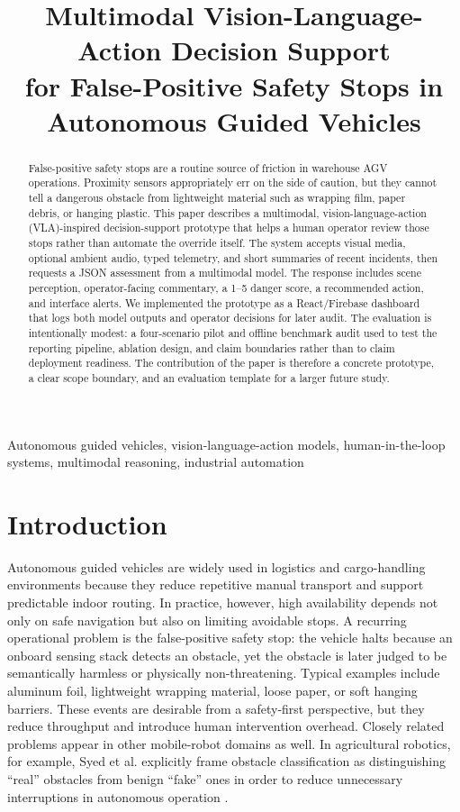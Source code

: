 \documentclass[conference]{IEEEtran}
\title{Multimodal Vision-Language-Action Decision Support\\for False-Positive Safety Stops in Autonomous Guided Vehicles}
\author{
\IEEEauthorblockN{Vikas Rathore, Neha Anil Khot}
\IEEEauthorblockA{
Information Technology\\
Frankfurt University of Applied Sciences\\
Autonomous Intelligent Systems\\
vikas.rathore@stud.fra-uas.de\\
neha.khot@stud.fra-uas.de
}
}
\begin{document}
\maketitle

\begin{abstract}
False-positive safety stops are a routine source of friction in warehouse AGV operations. Proximity sensors appropriately err on the side of caution, but they cannot tell a dangerous obstacle from lightweight material such as wrapping film, paper debris, or hanging plastic. This paper describes a multimodal, vision-language-action (VLA)-inspired decision-support prototype that helps a human operator review those stops rather than automate the override itself. The system accepts visual media, optional ambient audio, typed telemetry, and short summaries of recent incidents, then requests a JSON assessment from a multimodal model. The response includes scene perception, operator-facing commentary, a 1--5 danger score, a recommended action, and interface alerts. We implemented the prototype as a React/Firebase dashboard that logs both model outputs and operator decisions for later audit. The evaluation is intentionally modest: a four-scenario pilot and offline benchmark audit used to test the reporting pipeline, ablation design, and claim boundaries rather than to claim deployment readiness. The contribution of the paper is therefore a concrete prototype, a clear scope boundary, and an evaluation template for a larger future study.
\end{abstract}

\begin{IEEEkeywords}
Autonomous guided vehicles, vision-language-action models, human-in-the-loop systems, multimodal reasoning, industrial automation
\end{IEEEkeywords}

\section{Introduction}
Autonomous guided vehicles are widely used in logistics and cargo-handling environments because they reduce repetitive manual transport and support predictable indoor routing. In practice, however, high availability depends not only on safe navigation but also on limiting avoidable stops. A recurring operational problem is the false-positive safety stop: the vehicle halts because an onboard sensing stack detects an obstacle, yet the obstacle is later judged to be semantically harmless or physically non-threatening. Typical examples include aluminum foil, lightweight wrapping material, loose paper, or soft hanging barriers. These events are desirable from a safety-first perspective, but they reduce throughput and introduce human intervention overhead. Closely related problems appear in other mobile-robot domains as well. In agricultural robotics, for example, Syed et al. explicitly frame obstacle classification as distinguishing ``real'' obstacles from benign ``fake'' ones in order to reduce unnecessary interruptions in autonomous operation \cite{syed2025orchard}.
\end{document}
